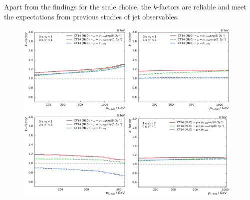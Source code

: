 Apart from the findings for the \ptavg scale choice, the $k$-factors are
reliable and meet the expectations from previous studies of jet observables.

\begin{figure}[htp]
    \centering
    \includegraphics[width=0.48\textwidth]{figures/theory/kfactor_comp_yb0ys0.pdf}\hfill
    \includegraphics[width=0.48\textwidth]{figures/theory/kfactor_comp_yb0ys1.pdf}
    \includegraphics[width=0.48\textwidth]{figures/theory/kfactor_comp_yb0ys2.pdf}\hfill
    \includegraphics[width=0.48\textwidth]{figures/theory/kfactor_comp_yb1ys0.pdf}

\end{figure}

